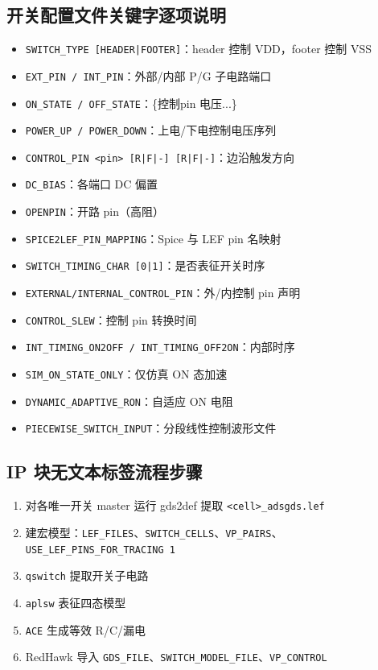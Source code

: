 \subsection{开关配置文件关键字逐项说明}
\begin{itemize}
  \item \texttt{SWITCH\_TYPE [HEADER|FOOTER]}：header 控制 VDD，footer 控制 VSS
  \item \texttt{EXT\_PIN / INT\_PIN}：外部/内部 P/G 子电路端口
  \item \texttt{ON\_STATE / OFF\_STATE}：\{控制pin 电压...\}
  \item \texttt{POWER\_UP / POWER\_DOWN}：上电/下电控制电压序列
  \item \texttt{CONTROL\_PIN <pin> [R|F|-] [R|F|-]}：边沿触发方向
  \item \texttt{DC\_BIAS}：各端口 DC 偏置
  \item \texttt{OPENPIN}：开路 pin（高阻）
  \item \texttt{SPICE2LEF\_PIN\_MAPPING}：Spice 与 LEF pin 名映射
  \item \texttt{SWITCH\_TIMING\_CHAR [0|1]}：是否表征开关时序
  \item \texttt{EXTERNAL/INTERNAL\_CONTROL\_PIN}：外/内控制 pin 声明
  \item \texttt{CONTROL\_SLEW}：控制 pin 转换时间
  \item \texttt{INT\_TIMING\_ON2OFF / INT\_TIMING\_OFF2ON}：内部时序
  \item \texttt{SIM\_ON\_STATE\_ONLY}：仅仿真 ON 态加速
  \item \texttt{DYNAMIC\_ADAPTIVE\_RON}：自适应 ON 电阻
  \item \texttt{PIECEWISE\_SWITCH\_INPUT}：分段线性控制波形文件
\end{itemize}

\subsection{IP 块无文本标签流程步骤}
\begin{enumerate}
  \item 对各唯一开关 master 运行 gds2def 提取 \texttt{<cell>\_adsgds.lef}
  \item 建宏模型：\texttt{LEF\_FILES}、\texttt{SWITCH\_CELLS}、\texttt{VP\_PAIRS}、\texttt{USE\_LEF\_PINS\_FOR\_TRACING 1}
  \item \texttt{qswitch} 提取开关子电路
  \item \texttt{aplsw} 表征四态模型
  \item \texttt{ACE} 生成等效 R/C/漏电
  \item RedHawk 导入 \texttt{GDS\_FILE}、\texttt{SWITCH\_MODEL\_FILE}、\texttt{VP\_CONTROL}
\end{enumerate}

